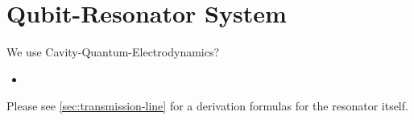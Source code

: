 
\section{Qubit-Resonator System \cite{cqeResonator}}

\begin{framed}\noindent
  We use Cavity-Quantum-Electrodynamics?
  \begin{itemize}
  \item
  \end{itemize}
\end{framed}

\begin{framed}\noindent
  Please   see  \autoref{sec:transmission-line}   for  a   derivation
  formulas for the resonator itself.
\end{framed}

